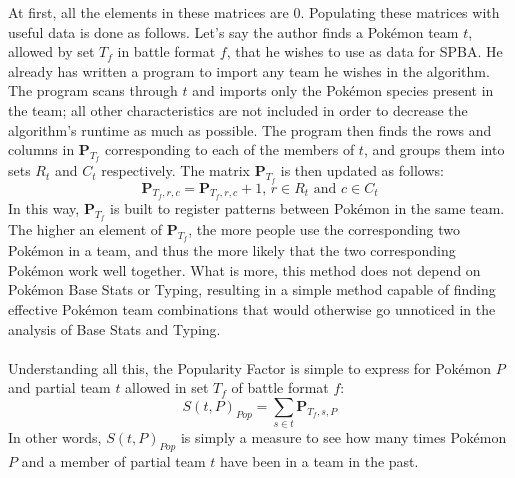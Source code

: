 \documentclass{article}
\begin{document}
At first, all the elements in these matrices are 0. Populating these matrices with useful data is done as follows.
Let's say the author finds a Pok\'emon team $t$, allowed by set $T_f$ in battle format $f$, that he wishes to use as data for SPBA. He already has written a program to import any team he wishes in the algorithm. The program scans through $t$ and imports only the Pok\'emon species present in the team; all other characteristics are not included in order to decrease the algorithm's runtime as much as possible. The program then finds the rows and columns in $\textbf{P}_{T_f}$ corresponding to each of the members of $t$, and groups them into sets $R_t$ and $C_t$ respectively. The matrix $\textbf{P}_{T_f}$ is then updated as follows:
\begin{equation*}
	\textbf{P}_{T_f,r,c}=\textbf{P}_{T_f,r,c}+1\text{, }r\in R_t\text{ and }c\in C_t
\end{equation*}
In this way, $\textbf{P}_{T_f}$ is built to register patterns between Pok\'emon in the same team. The higher an element of $\textbf{P}_{T_f}$, the more people use the corresponding two Pok\'emon in a team, and thus the more likely that the two corresponding Pok\'emon work well together. What is more, this method does not depend on Pok\'emon Base Stats or Typing, resulting in a simple method capable of finding effective Pok\'emon team combinations that would otherwise go unnoticed in the analysis of Base Stats and Typing.\\\\
Understanding all this, the Popularity Factor is simple to express for Pok\'emon $P$ and partial team $t$ allowed in set $T_f$ of battle format $f$:
\begin{equation}\label{popScoreEqn}
	S(t,P)_{Pop}=\sum_{s\in t}\textbf{P}_{T_f,s,P}
\end{equation}
In other words, $S(t,P)_{Pop}$ is simply a measure to see how many times Pok\'emon $P$ and a member of partial team $t$ have been in a team in the past.
\end{document}
